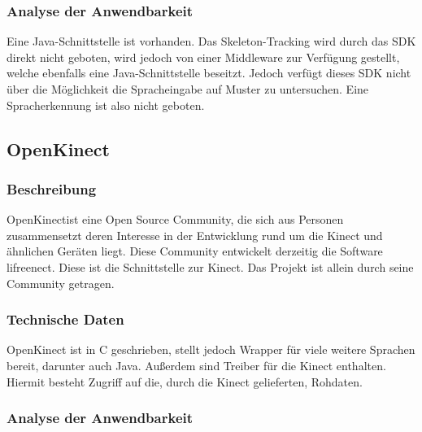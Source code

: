 \subsubsection{Analyse der Anwendbarkeit}

Eine Java-Schnittstelle ist vorhanden. Das Skeleton-Tracking wird durch das SDK direkt nicht geboten, wird jedoch von einer Middleware zur Verf\"ugung gestellt, 
welche ebenfalls eine Java-Schnittstelle beseitzt. Jedoch verf\"ugt dieses SDK nicht \"uber die M\"oglichkeit die Spracheingabe auf Muster zu untersuchen. Eine Spracherkennung ist also nicht geboten.

\newpage

\subsection{OpenKinect}

\subsubsection{Beschreibung}

OpenKinect\footnotemark[11] ist eine Open Source Community, die sich aus Personen zusammensetzt deren Interesse in der Entwicklung rund um die Kinect und \"ahnlichen Ger\"aten liegt.
Diese Community entwickelt derzeitig die Software lifreenect. Diese ist die Schnittstelle zur Kinect. Das Projekt ist allein durch seine Community getragen.

\subsubsection{Technische Daten}

OpenKinect ist in C geschrieben, stellt jedoch Wrapper f\"ur viele weitere Sprachen bereit\footnotemark[12], darunter auch Java. Außerdem sind Treiber f\"ur die Kinect enthalten.
Hiermit besteht Zugriff auf die, durch die Kinect gelieferten, Rohdaten.


\subsubsection{Analyse der Anwendbarkeit}

